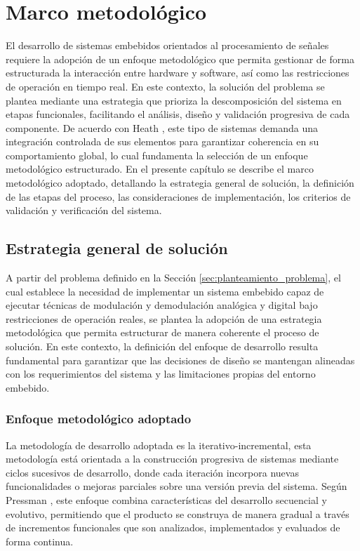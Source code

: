 
\chapter{Marco metodológico}
\label{ch:solucion}

El desarrollo de sistemas embebidos orientados al procesamiento de señales requiere la adopción de un enfoque metodológico que permita gestionar de forma estructurada la interacción entre hardware y software, así como las restricciones de operación en tiempo real. En este contexto, la solución del problema se plantea mediante una estrategia que prioriza la descomposición del sistema en etapas funcionales, facilitando el análisis, diseño y validación progresiva de cada componente. De acuerdo con Heath \cite{heath2002}, este tipo de sistemas demanda una integración controlada de sus elementos para garantizar coherencia en su comportamiento global, lo cual fundamenta la selección de un enfoque metodológico estructurado. En el presente capítulo se describe el marco metodológico adoptado, detallando la estrategia general de solución, la definición de las etapas del proceso, las consideraciones de implementación, los criterios de validación y verificación del sistema.
 
\section{Estrategia general de solución}

A partir del problema definido en la Sección \ref{sec:planteamiento_problema}, el cual establece la necesidad de implementar un sistema embebido capaz de ejecutar técnicas de modulación y demodulación analógica y digital bajo restricciones de operación reales, se plantea la adopción de una estrategia metodológica que permita estructurar de manera coherente el proceso de solución. En este contexto, la definición del enfoque de desarrollo resulta fundamental para garantizar que las decisiones de diseño se mantengan alineadas con los requerimientos del sistema y las limitaciones propias del entorno embebido.

\subsection{Enfoque metodológico adoptado}

La metodología de desarrollo adoptada es la iterativo-incremental, esta metodología está orientada a la construcción progresiva de sistemas mediante ciclos sucesivos de desarrollo, donde cada iteración incorpora nuevas funcionalidades o mejoras parciales sobre una versión previa del sistema. Según Pressman \cite{pressman2010}, este enfoque combina características del desarrollo secuencial y evolutivo, permitiendo que el producto se construya de manera gradual a través de incrementos funcionales que son analizados, implementados y evaluados de forma continua.

